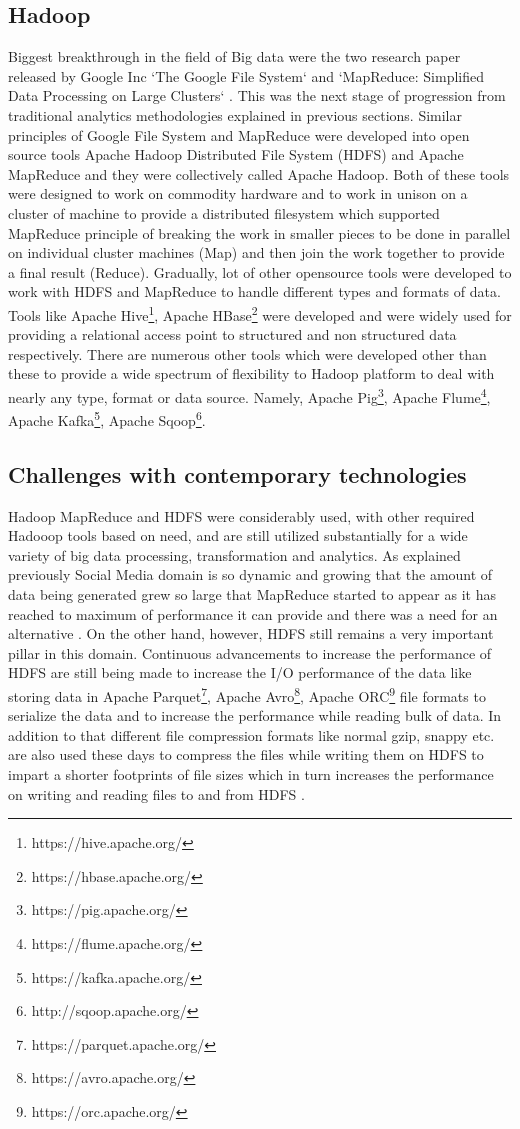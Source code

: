\documentclass[sigconf]{acmart}
\begin{document}
\subsection{Hadoop}
Biggest breakthrough in the field of Big data were the two research paper released by Google Inc `The Google File System` \cite{ghemawatgoogle} and `MapReduce: Simplified Data Processing on Large Clusters` \cite{mapreducegoogle}. This was the next stage of progression from traditional analytics methodologies explained in previous sections. Similar principles of Google File System and MapReduce were developed into open source tools Apache Hadoop Distributed File System (HDFS) and Apache MapReduce and they were collectively called Apache Hadoop. Both of these tools were designed to work on commodity hardware and to work in unison on a cluster of machine to provide a distributed filesystem which supported MapReduce principle of breaking the work in smaller pieces to be done in parallel on individual cluster machines (Map) and then join the work together to provide a final result (Reduce). Gradually, lot of other opensource tools were developed to work with HDFS and MapReduce to handle different types and formats of data. Tools like Apache Hive\footnote{https://hive.apache.org/}, Apache HBase\footnote{https://hbase.apache.org/} were developed and were widely used for providing a relational access point to structured and non structured data respectively. There are numerous other tools which were developed other than these to provide a wide spectrum of flexibility to Hadoop platform to deal with nearly any type, format or data source. Namely, Apache Pig\footnote{https://pig.apache.org/}, Apache Flume\footnote{https://flume.apache.org/}, Apache Kafka\footnote{https://kafka.apache.org/}, Apache Sqoop\footnote{http://sqoop.apache.org/}. 
\subsection{Challenges with contemporary technologies}
Hadoop MapReduce and HDFS were considerably used, with other required Hadooop tools based on need, and are still utilized substantially for a wide variety of big data processing, transformation and analytics. As explained previously Social Media domain is so dynamic and growing that the amount of data being generated  \cite{fbstats} grew so large that MapReduce started to appear as it has reached to maximum of performance it can provide and there was a need for an alternative  \cite{sparkvsmapr}. On the other hand, however, HDFS still remains a very important pillar in this domain. Continuous advancements to increase the performance of HDFS are still being made to increase the I/O performance of the data like storing data in Apache Parquet\footnote{https://parquet.apache.org/}, Apache Avro\footnote{https://avro.apache.org/}, Apache ORC\footnote{https://orc.apache.org/} file formats to serialize the data and to increase the performance while reading bulk of data. In addition to that different file compression formats like normal gzip, snappy etc. are also used these days to compress the files while writing them on HDFS to impart a shorter footprints of file sizes which in turn increases the performance on writing and reading files to and from HDFS \cite{dataformats}.
\end{document}
